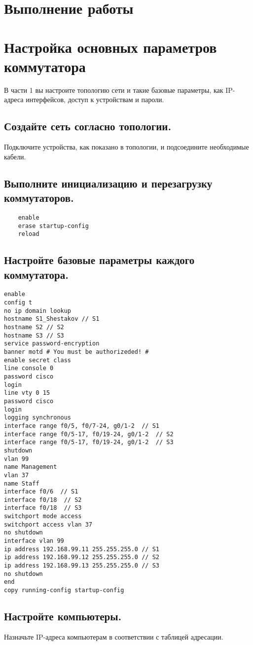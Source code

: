 \section*{\LARGE Выполнение работы}


\section{Настройка основных параметров коммутатора}
В части 1 вы настроите топологию сети и такие базовые параметры, как IP-адреса интерфейсов,
доступ к устройствам и пароли.

\subsection{Создайте сеть согласно топологии.}
Подключите устройства, как показано в топологии, и подсоедините необходимые кабели.

\subsection{Выполните инициализацию и перезагрузку коммутаторов. }
\begin{verbatim}
    enable
    erase startup-config
    reload
\end{verbatim}

\subsection{Настройте базовые параметры каждого коммутатора.}
\begin{verbatim}
enable
config t
no ip domain lookup
hostname S1_Shestakov // S1
hostname S2 // S2
hostname S3 // S3
service password-encryption
banner motd # You must be authorizeded! #
enable secret class
line console 0
password cisco
login
line vty 0 15
password cisco
login
logging synchronous
interface range f0/5, f0/7-24, g0/1-2  // S1
interface range f0/5-17, f0/19-24, g0/1-2  // S2
interface range f0/5-17, f0/19-24, g0/1-2  // S3
shutdown
vlan 99
name Management
vlan 37
name Staff
interface f0/6  // S1
interface f0/18  // S2
interface f0/18  // S3
switchport mode access
switchport access vlan 37
no shutdown
interface vlan 99
ip address 192.168.99.11 255.255.255.0 // S1
ip address 192.168.99.12 255.255.255.0 // S2
ip address 192.168.99.13 255.255.255.0 // S3
no shutdown
end
copy running-config startup-config
\end{verbatim}

\subsection{Настройте компьютеры.}
Назначьте IP-адреса компьютерам в соответствии с таблицей адресации.
